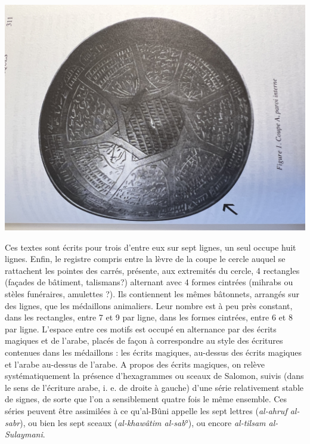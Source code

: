 \includegraphics[width=\textwidth]{HommeetIslam/Images/IMG_2455.JPG}


Ces textes sont écrits pour trois d'entre eux sur sept lignes, un seul occupe huit lignes. Enfin, le registre compris entre la lèvre de la coupe le cercle auquel se rattachent les pointes des carrés, présente, aux extremités du cercle, 4 rectangles (façades de bâtiment, talismans?) alternant avec  4 formes cintrées (mihrabs ou stèles funéraires, amulettes ?). Ils contiennent les mêmes bâtonnets, arrangés sur des lignes, que les médaillons animaliers. Leur nombre est à peu près constant, dans les rectangles, entre 7 et 9 par ligne, dans les formes cintrées, entre 6 et 8 par ligne. L'espace entre ces motifs est occupé en alternance par des écrits magiques et de l'arabe, placés de façon à correspondre au style des écritures contenues dans les médaillons : les écrits magiques, au-dessus des écrits magiques et l'arabe au-dessus de l'arabe. A propos des écrits magiques, on relève systématiquement la présence d'hexagrammes ou sceaux de Salomon, suivis (dans le sens de l'écriture arabe, i. e. de droite à gauche) d'une série relativement stable de signes, de sorte que l'on a sensiblement quatre fois le même ensemble. Ces séries peuvent être assimilées à ce qu'al-Bûni appelle les sept lettres (\textit{al-ahruf al-sabr}), ou bien les
sept sceaux (\textit{al-khawâtim al-sab}°), ou encore \textit{al-tilsam al-Sulaymani}. 


